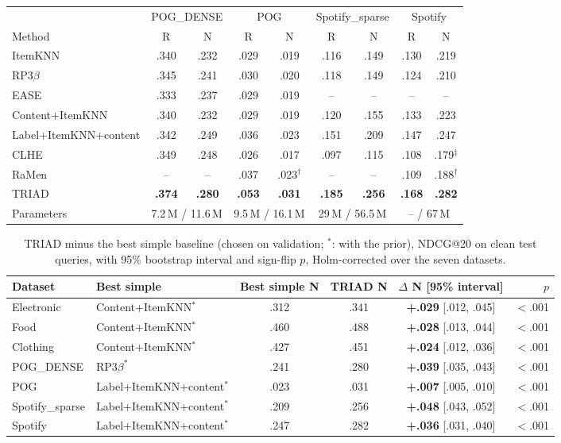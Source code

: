 \documentclass[runningheads]{llncs}
\begin{document}
\begin{table}[t]
\medskip
\begin{tabular}{lcccccccc}
\toprule
 & \multicolumn{2}{c}{POG\_DENSE} & \multicolumn{2}{c}{POG} & \multicolumn{2}{c}{Spotify\_sparse} & \multicolumn{2}{c}{Spotify}\\
\cmidrule(lr){2-3}\cmidrule(lr){4-5}\cmidrule(lr){6-7}\cmidrule(lr){8-9}
Method & R & N & R & N & R & N & R & N\\
\midrule
ItemKNN & .340 & .232 & .029 & .019 & .116 & .149 & .130 & .219\\
RP3$\beta$ & .345 & .241 & .030 & .020 & .118 & .149 & .124 & .210\\
EASE & .333 & .237 & .029 & .019 & -- & -- & -- & --\\
Content+ItemKNN & .340 & .232 & .029 & .019 & .120 & .155 & .133 & .223\\
Label+ItemKNN+content & .342 & .249 & .036 & .023 & .151 & .209 & .147 & .247\\
\midrule
CLHE & .349 & .248 & .026 & .017 & .097 & .115 & .108 & .179$^\ddagger$\\
RaMen & -- & -- & .037 & .023$^\dagger$ & -- & -- & .109 & .188$^\dagger$\\
\midrule
TRIAD & \textbf{.374} & \textbf{.280} & \textbf{.053} & \textbf{.031} & \textbf{.185} & \textbf{.256} & \textbf{.168} & \textbf{.282}\\
\midrule
Parameters & \multicolumn{2}{c}{7.2\,M / 11.6\,M} & \multicolumn{2}{c}{9.5\,M / 16.1\,M} & \multicolumn{2}{c}{29\,M / 56.5\,M} & \multicolumn{2}{c}{-- / 67\,M}\\
\bottomrule
\end{tabular}
\end{table}

\begin{table}[t]
\centering
\caption{TRIAD minus the best simple baseline (chosen on validation; $^{*}$: with the prior), NDCG@20 on clean test
queries, with 95\% bootstrap interval and sign-flip $p$, Holm-corrected over the seven datasets.}
\label{tab:tests}
\setlength{\tabcolsep}{2.2pt}
\scriptsize
\begin{tabular}{llcccr}
\toprule
Dataset & Best simple & Best simple N & TRIAD N & $\Delta$ N [95\% interval] & $p$\\
\midrule
Electronic & Content+ItemKNN$^{*}$ & .312 & .341 & \textbf{+.029} [.012, .045] & $<$.001\\
Food & Content+ItemKNN$^{*}$ & .460 & .488 & \textbf{+.028} [.013, .044] & $<$.001\\
Clothing & Content+ItemKNN$^{*}$ & .427 & .451 & \textbf{+.024} [.012, .036] & $<$.001\\
POG\_DENSE & RP3$\beta^{*}$ & .241 & .280 & \textbf{+.039} [.035, .043] & $<$.001\\
POG & Label+ItemKNN+content$^{*}$ & .023 & .031 & \textbf{+.007} [.005, .010] & $<$.001\\
Spotify\_sparse & Label+ItemKNN+content$^{*}$ & .209 & .256 & \textbf{+.048} [.043, .052] & $<$.001\\
Spotify & Label+ItemKNN+content$^{*}$ & .247 & .282 & \textbf{+.036} [.031, .040] & $<$.001\\
\bottomrule
\end{tabular}
\end{table}
\end{document}
